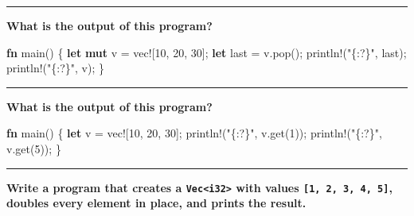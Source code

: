 \documentclass[
  11pt,
]{article}
\newenvironment{Shaded}{}{}
\newcommand{\DecValTok}[1]{\textcolor[rgb]{0.25,0.63,0.44}{#1}}
\newcommand{\KeywordTok}[1]{\textcolor[rgb]{0.00,0.44,0.13}{\textbf{#1}}}
\newcommand{\NormalTok}[1]{#1}
\newcommand{\OperatorTok}[1]{\textcolor[rgb]{0.40,0.40,0.40}{#1}}
\newcommand{\PreprocessorTok}[1]{\textcolor[rgb]{0.74,0.48,0.00}{#1}}
\newcommand{\StringTok}[1]{\textcolor[rgb]{0.25,0.44,0.63}{#1}}
\begin{document}
\begin{center}\rule{0.5\linewidth}{0.5pt}\end{center}

\textbf{What is the output of this program?}

\begin{Shaded}
\begin{Highlighting}[]
\KeywordTok{fn}\NormalTok{ main() }\OperatorTok{\{}
    \KeywordTok{let} \KeywordTok{mut}\NormalTok{ v }\OperatorTok{=} \PreprocessorTok{vec!}\NormalTok{[}\DecValTok{10}\OperatorTok{,} \DecValTok{20}\OperatorTok{,} \DecValTok{30}\NormalTok{]}\OperatorTok{;}
    \KeywordTok{let}\NormalTok{ last }\OperatorTok{=}\NormalTok{ v}\OperatorTok{.}\NormalTok{pop()}\OperatorTok{;}
    \PreprocessorTok{println!}\NormalTok{(}\StringTok{"\{:?\}"}\OperatorTok{,}\NormalTok{ last)}\OperatorTok{;}
    \PreprocessorTok{println!}\NormalTok{(}\StringTok{"\{:?\}"}\OperatorTok{,}\NormalTok{ v)}\OperatorTok{;}
\OperatorTok{\}}
\end{Highlighting}
\end{Shaded}

\begin{center}\rule{0.5\linewidth}{0.5pt}\end{center}

\textbf{What is the output of this program?}

\begin{Shaded}
\begin{Highlighting}[]
\KeywordTok{fn}\NormalTok{ main() }\OperatorTok{\{}
    \KeywordTok{let}\NormalTok{ v }\OperatorTok{=} \PreprocessorTok{vec!}\NormalTok{[}\DecValTok{10}\OperatorTok{,} \DecValTok{20}\OperatorTok{,} \DecValTok{30}\NormalTok{]}\OperatorTok{;}
    \PreprocessorTok{println!}\NormalTok{(}\StringTok{"\{:?\}"}\OperatorTok{,}\NormalTok{ v}\OperatorTok{.}\NormalTok{get(}\DecValTok{1}\NormalTok{))}\OperatorTok{;}
    \PreprocessorTok{println!}\NormalTok{(}\StringTok{"\{:?\}"}\OperatorTok{,}\NormalTok{ v}\OperatorTok{.}\NormalTok{get(}\DecValTok{5}\NormalTok{))}\OperatorTok{;}
\OperatorTok{\}}
\end{Highlighting}
\end{Shaded}

\begin{center}\rule{0.5\linewidth}{0.5pt}\end{center}

\textbf{Write a program that creates a
\texttt{Vec\textless{}i32\textgreater{}} with values
\texttt{{[}1,\ 2,\ 3,\ 4,\ 5{]}}, doubles every element in place, and
prints the result.}
\end{document}
